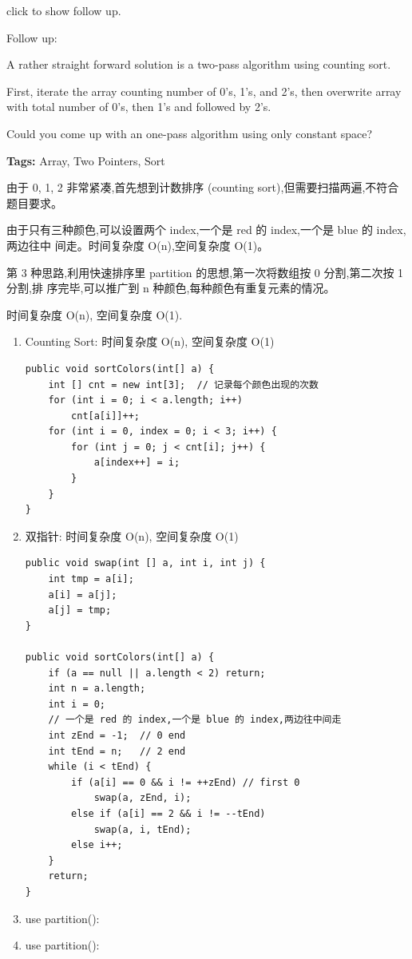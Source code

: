 \documentclass[12pt]{book}
\begin{document}
click to show follow up.

Follow up:

A rather straight forward solution is a two-pass algorithm using counting sort.

First, iterate the array counting number of 0's, 1's, and 2's, then overwrite array with total number of 0's, then 1's and followed by 2's.

Could you come up with an one-pass algorithm using only constant space?

\textbf{Tags:} Array, Two Pointers, Sort

由于 0, 1, 2 非常紧凑,首先想到计数排序 (counting sort),但需要扫描两遍,不符合题目要求。

由于只有三种颜色,可以设置两个 index,一个是 red 的 index,一个是 blue 的 index,两边往中
间走。时间复杂度 O(n),空间复杂度 O(1)。

第 3 种思路,利用快速排序里 partition 的思想,第一次将数组按 0 分割,第二次按 1 分割,排
序完毕,可以推广到 n 种颜色,每种颜色有重复元素的情况。

时间复杂度 O(n), 空间复杂度 O(1). 

\begin{enumerate}
\item Counting Sort: 时间复杂度 O(n), 空间复杂度 O(1)
\label{sec-7-2-1-1}

\lstset{language=java,label= ,caption= ,numbers=none}
\begin{lstlisting}
public void sortColors(int[] a) {
    int [] cnt = new int[3];  // 记录每个颜色出现的次数
    for (int i = 0; i < a.length; i++) 
        cnt[a[i]]++;
    for (int i = 0, index = 0; i < 3; i++) {
        for (int j = 0; j < cnt[i]; j++) {
            a[index++] = i;
        }
    }
}
\end{lstlisting}

\item 双指针: 时间复杂度 O(n), 空间复杂度 O(1)
\label{sec-7-2-1-2}
\lstset{language=java,label= ,caption= ,numbers=none}
\begin{lstlisting}
public void swap(int [] a, int i, int j) {
    int tmp = a[i];
    a[i] = a[j];
    a[j] = tmp;
}

public void sortColors(int[] a) {
    if (a == null || a.length < 2) return;
    int n = a.length;
    int i = 0;
    // 一个是 red 的 index,一个是 blue 的 index,两边往中间走
    int zEnd = -1;  // 0 end
    int tEnd = n;   // 2 end
    while (i < tEnd) {
        if (a[i] == 0 && i != ++zEnd) // first 0
            swap(a, zEnd, i);
        else if (a[i] == 2 && i != --tEnd)
            swap(a, i, tEnd);
        else i++;
    }
    return;
}
\end{lstlisting}

\item use partition():
\label{sec-7-2-1-3}
\item use partition():
\label{sec-7-2-1-4}
\end{enumerate}
\end{document}
